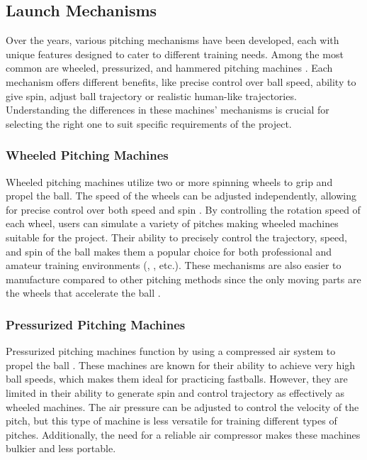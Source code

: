 \documentclass[12pt]{report}
\newenvironment{indentedsection}{
    \setlength{\parindent}{1cm} %
    \setlength{\leftskip}{1cm} %
}{}
\begin{document}
\subsection{Launch Mechanisms}


Over the years, various pitching mechanisms have been developed, each with unique features designed to cater to different training needs. Among the most common are wheeled, pressurized, and hammered pitching machines  \cite{Lan2024}. Each mechanism offers different benefits, like precise control over ball speed, ability to give spin, adjust ball trajectory or realistic human-like trajectories. Understanding the differences in these machines’ mechanisms is crucial for selecting the right one to suit specific requirements of the project. 

\begin{indentedsection}

\subsubsection{Wheeled Pitching Machines}

Wheeled pitching machines utilize two or more spinning wheels to grip and propel the ball. The speed of the wheels can be adjusted independently, allowing for precise control over both speed and spin \cite{Dittrich2023}. By controlling the rotation speed of each wheel, users can simulate a variety of pitches making wheeled machines suitable for the project. Their ability to precisely control the trajectory, speed, and spin of the ball makes them a popular choice for both professional and amateur training environments (\cite{zxmoto2022}, \cite{amazon2024}, \cite{ipong2022} etc.). These mechanisms are also easier to manufacture compared to other pitching methods since the only moving parts are the wheels that accelerate the ball \cite{Zhang2021}.

\subsubsection{Pressurized Pitching Machines}

Pressurized pitching machines function by using a compressed air system to propel the ball \cite{Wiley1994}. These machines are known for their ability to achieve very high ball speeds, which makes them ideal for practicing fastballs. However, they are limited in their ability to generate spin and control trajectory as effectively as wheeled machines. The air pressure can be adjusted to control the velocity of the pitch, but this type of machine is less versatile for training different types of pitches. Additionally, the need for a reliable air compressor makes these machines bulkier and less portable. 


\end{indentedsection}
\end{document}
